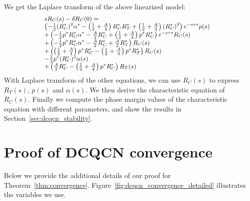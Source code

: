  We get the Laplace transform of the above linearized model:
\begin{equation}
\small
\begin{array}{l}
s{R_C}(s) - \delta {R_C}(0) = \\
\left( { - \frac{1}{2}{{(R_C^*)}^2}{\alpha ^*} - \left( {\frac{1}{2} + \frac{A}{4}} \right)R_C^*R_T^* + \left( {\frac{1}{2} + \frac{A}{4}} \right){{(R_C^*)}^2}} \right){e^{ - s\tau *}}p(s)\\
 + \left( { - \frac{1}{2}{p^*}R_C^*{\alpha ^*} - \frac{A}{2}R_C^* + \left( {\frac{1}{2} + \frac{A}{4}} \right){p^*}R_C^*} \right){e^{ - s\tau *}}{R_C}(s)\\
 + \left( { - \frac{1}{2}{p^*}R_C^*{\alpha ^*} - \frac{A}{2}R_C^* + \frac{A}{2}R_T^* }\right){R_C}(s)\\
 + \left( { \left( {\frac{1}{2} + \frac{A}{4}} \right){p^*}R_C^* - \left( {\frac{1}{2} + \frac{A}{4}} \right){p^*}R_T^*} \right){R_C}(s)\\
 - \frac{1}{2}{p^*}{(R_C^*)^2}\alpha (s)\\
 + \left( {\frac{A}{2}R_C^* - \left( {\frac{1}{2} + \frac{A}{4}} \right){p^*}R_C^*} \right){R_T}(s)
\end{array}
\end{equation}
With Laplace transform of the other equations, we can use ${R_C}(s)$ to express
${R_T}(s)$, $p(s)$ and $\alpha (s)$.  We then derive the characteristic equation
of ${R_C}(s)$. Finally we compute the phase margin values of the characteristic equation
with different parameters, and show the results in Section~\ref{sec:dcqcn_stability}.


\section{Proof of DCQCN convergence}
\label{sec:alpha_proof}

Below we provide the additional details of our proof for Theorem~\ref{thm:convergence}. 
Figure~\ref{fig:dcqcn_convergence_detailed} illustrates the variables we use.

